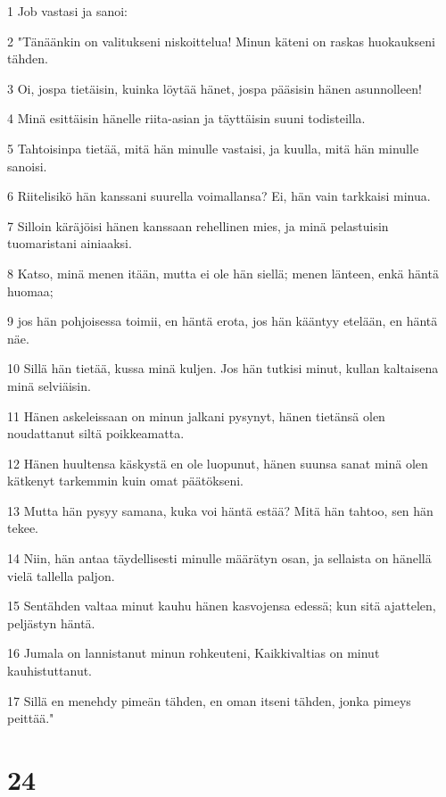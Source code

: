 \par 1 Job vastasi ja sanoi:
\par 2 "Tänäänkin on valitukseni niskoittelua! Minun käteni on raskas huokaukseni tähden.
\par 3 Oi, jospa tietäisin, kuinka löytää hänet, jospa pääsisin hänen asunnolleen!
\par 4 Minä esittäisin hänelle riita-asian ja täyttäisin suuni todisteilla.
\par 5 Tahtoisinpa tietää, mitä hän minulle vastaisi, ja kuulla, mitä hän minulle sanoisi.
\par 6 Riitelisikö hän kanssani suurella voimallansa? Ei, hän vain tarkkaisi minua.
\par 7 Silloin käräjöisi hänen kanssaan rehellinen mies, ja minä pelastuisin tuomaristani ainiaaksi.
\par 8 Katso, minä menen itään, mutta ei ole hän siellä; menen länteen, enkä häntä huomaa;
\par 9 jos hän pohjoisessa toimii, en häntä erota, jos hän kääntyy etelään, en häntä näe.
\par 10 Sillä hän tietää, kussa minä kuljen. Jos hän tutkisi minut, kullan kaltaisena minä selviäisin.
\par 11 Hänen askeleissaan on minun jalkani pysynyt, hänen tietänsä olen noudattanut siltä poikkeamatta.
\par 12 Hänen huultensa käskystä en ole luopunut, hänen suunsa sanat minä olen kätkenyt tarkemmin kuin omat päätökseni.
\par 13 Mutta hän pysyy samana, kuka voi häntä estää? Mitä hän tahtoo, sen hän tekee.
\par 14 Niin, hän antaa täydellisesti minulle määrätyn osan, ja sellaista on hänellä vielä tallella paljon.
\par 15 Sentähden valtaa minut kauhu hänen kasvojensa edessä; kun sitä ajattelen, peljästyn häntä.
\par 16 Jumala on lannistanut minun rohkeuteni, Kaikkivaltias on minut kauhistuttanut.
\par 17 Sillä en menehdy pimeän tähden, en oman itseni tähden, jonka pimeys peittää."

\chapter{24}

